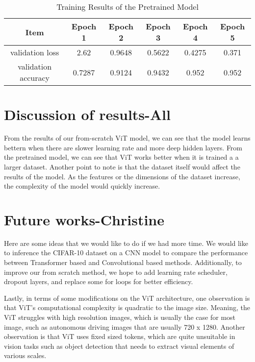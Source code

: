 \documentclass{article} %
\begin{document}
\begin{table}[ht]
  \centering
    \begin{tabular}{ c | c | c | c | c  | c }
      \hline
      Item & Epoch 1 & Epoch 2 & Epoch 3 & Epoch 4 & Epoch 5 \\ \hline
      validation loss & 2.62 & 0.9648 & 0.5622 & 0.4275 & 0.371\\ \hline
      validation accuracy & 0.7287  & 0.9124 & 0.9432 & 0.952 & 0.952 \\ \hline
    \end{tabular}
    \caption{Training Results of the Pretrained Model}
  \label{tab:my_label}
\end{table}

\section{Discussion of results-All}
From the results of our from-scratch ViT model, we can see that the model learns bettern
when there are slower learning rate and  more deep hidden layers. 
From the pretrained model, we can see that ViT works better when it is trained a a larger 
dataset.
Another point to note is that the dataset itself would affect the results of the model. As the 
features or the dimensions of the dataset increase, the complexity of the model would quickly increase.  


\section{Future works-Christine}
Here are some ideas that we would like to do if we had more time. We would like to inference the CIFAR-10 dataset on a CNN model to compare the performance between Transformer based and Convolutional based methods. Additionally, to improve our from scratch method, we hope to add learning rate scheduler, dropout layers, and replace some for loops for better efficiency.

Lastly, in terms of some modifications on the ViT architecture, one observation is that ViT's computational complexity is quadratic to the image size. Meaning, the ViT struggles with high resolution images, which is usually the case for most image, such as autonomous driving images that are usually 720 x 1280. Another observation is that ViT uses fixed sized tokens, which are quite unsuitable in vision tasks such as object detection that needs to extract visual elements of various scales.
\end{document}

